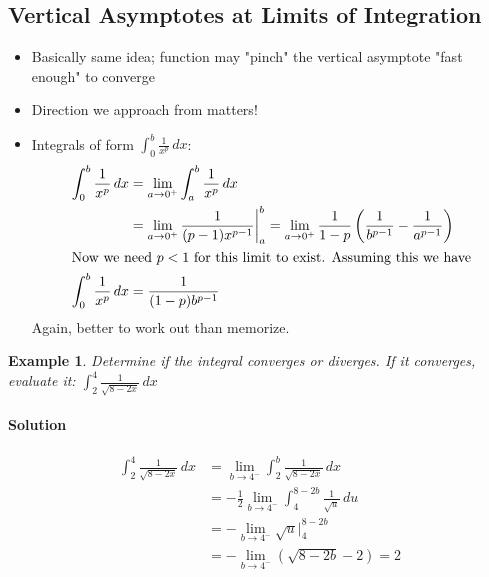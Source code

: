 \documentclass[letterpaper, 11pt, openany]{book}
\theoremstyle{mytheoremstyle}
\theoremstyle{myexamplestyle}
\newtheorem{example}{Example}[section]
\newenvironment{solution}{\paragraph{\sffamily \smaller \fontseries{b}\selectfont Solution}}{\hfill\faSquare}
\begin{document}
\subsection{Vertical Asymptotes at Limits of Integration}
\begin{itemize}
    \item Basically same idea; function may "pinch" the vertical asymptote "fast enough" to converge
    \item Direction we approach from matters!
    \item Integrals of form $\displaystyle \int_{0}^{b} \frac{1}{x^{p}} \, dx$:
    \begin{align*}
        \int_{0}^{b} \frac{1}{x^{p}} \, dx  &= \lim_{a \to 0^{+}} \int_{a}^{b} \frac{1}{x^{p}} \, dx\\
                                            &= \lim_{a \to 0^{+}} \frac{1}{(p-1)x^{p - 1}}\bigg|_{a}^{b} = \lim_{a \to 0^{+}} \frac{1}{1 - p} \left( \frac{1}{b^{p-1}} - \frac{1}{a^{p-1}} \right)\\
    \intertext{Now we need $p < 1$ for this limit to exist. Assuming this we have}
    \int_{0}^{b} \frac{1}{x^{p}}\, dx  &= \frac{1}{(1 - p)b^{p-1}}
    \end{align*}
    Again, better to work out than memorize.
\end{itemize}

\begin{example}\label{e:impintasymp}
    Determine if the integral converges or diverges. If it converges, evaluate it: $\displaystyle \int_{2}^{4} \frac{1}{\sqrt{8-2x}} \, dx$
    
    \begin{solution}
        \begin{align*}
            \int_{2}^{4} \frac{1}{\sqrt{8-2x}} \, dx    &= \lim_{b \to 4^{-}} \int_{2}^{b} \frac{1}{\sqrt{8-2x}} \, dx\\
                                                        &= -\frac{1}{2} \lim_{b \to 4^{-}} \int_{4}^{8-2b} \frac{1}{\sqrt{u}}\, du\\
                                                        &= -\lim_{b \to 4^{-}} \sqrt{u}\Big|_{4}^{8-2b}\\
                                                        &= -\lim_{b \to 4^{-}} \left( \sqrt{8-2b} - 2 \right) = 2
        \end{align*}
    \end{solution}
\end{example}
\end{document}
